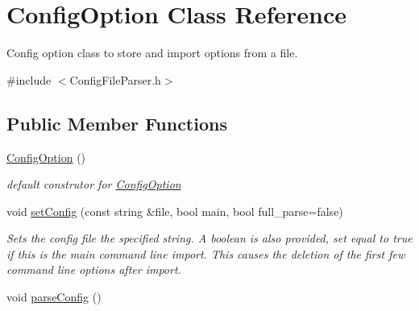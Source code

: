 \hypertarget{class_config_option}{}\section{Config\+Option Class Reference}
\label{class_config_option}


Config option class to store and import options from a file.  




{\ttfamily \#include $<$Config\+File\+Parser.\+h$>$}

\subsection*{Public Member Functions}
\begin{DoxyCompactItemize}
\item 
\hyperlink{class_config_option_ac0639cf9fc6660b1436ebc9e7af52525}{Config\+Option} ()\hypertarget{class_config_option_ac0639cf9fc6660b1436ebc9e7af52525}{}\label{class_config_option_ac0639cf9fc6660b1436ebc9e7af52525}

\begin{DoxyCompactList}\small\item\em default construtor for \hyperlink{class_config_option}{Config\+Option} \end{DoxyCompactList}\item 
void \hyperlink{class_config_option_ac1ae69813100e755359b25b11dfeb8c7}{set\+Config} (const string \&file, bool main, bool full\+\_\+parse=false)
\begin{DoxyCompactList}\small\item\em Sets the config file the specified string. A boolean is also provided, set equal to true if this is the main command line import. This causes the deletion of the first few command line options after import. \end{DoxyCompactList}\item 
void \hyperlink{class_config_option_a45cdefa1516c378e5a90803d594ccd34}{parse\+Config} ()\hypertarget{class_config_option_a45cdefa1516c378e5a90803d594ccd34}{}\label{class_config_option_a45cdefa1516c378e5a90803d594ccd34}


\end{DoxyCompactItemize}

